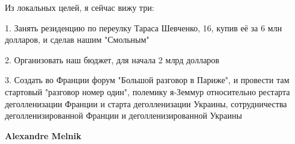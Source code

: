 \begin{itemize}
\begin{itemize}
Из локальных целей, я сейчас вижу три:

1. Занять резиденцию по переулку Тараса Шевченко, 16, купив её за 6 млн
долларов, и сделав нашим "Смольным"

2. Организовать наш бюджет, для начала 2 млрд долларов

3. Создать во Франции форум "Большой разговор в Париже", и провести там
стартовый "разговор номер один", полемику я-Земмур относительно рестарта
деголленизации Франции и старта деголленизации Украины, сотрудничества
деголленизированной Франции и деголленизированной Украины


 
\textbf{Alexandre Melnik}
\end{itemize}

\end{itemize}


